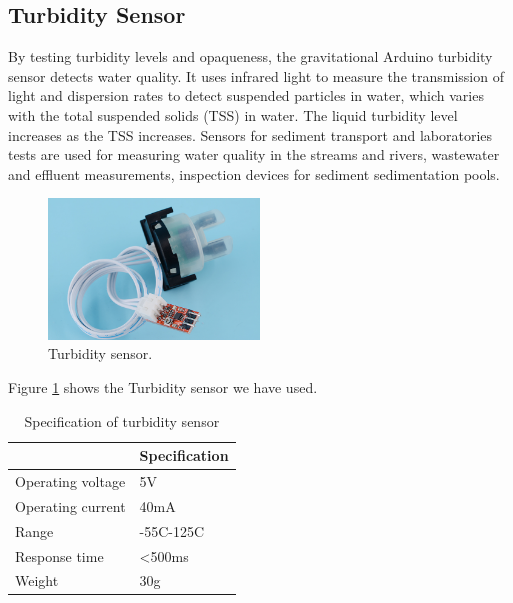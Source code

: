\subsection{Turbidity Sensor}
By testing turbidity levels and opaqueness, the gravitational Arduino turbidity sensor detects water quality. It uses infrared light to measure the transmission of light and dispersion rates to detect suspended particles in water, which varies with the total suspended solids (TSS) in water. The liquid turbidity level increases as the TSS increases. Sensors for sediment transport and laboratories tests are used for measuring water quality in the streams and rivers, wastewater and effluent measurements, inspection devices for sediment sedimentation pools.
\begin{figure}[h]
\centering
\includegraphics[width=0.5\textwidth]{figures/turbidity_sensor.jpg}
\caption{Turbidity sensor.}
\label{Turbidity1}
\end{figure}
Figure \ref{Turbidity1} shows the Turbidity sensor we have used.

\begin{table}[H]
\centering
\caption{Specification of turbidity sensor}
\begin{tabular}{|l|l|}
\hline
\multicolumn{1}{|c|}{\cellcolor[HTML]{FFFFFF}{\color[HTML]{333333} \textbf{Characteristics}}} & \textbf{Specification} \\ \hline
Operating voltage                                                                       & 5V                     \\ \hline
Operating current                                                                       & 40mA                   \\ \hline
Range                                                                                   & -55C-125C              \\ \hline
Response time                                                                            & \textless{}500ms       \\ \hline
Weight                                                                                  & 30g                    \\ \hline
\end{tabular}
\end{table}

